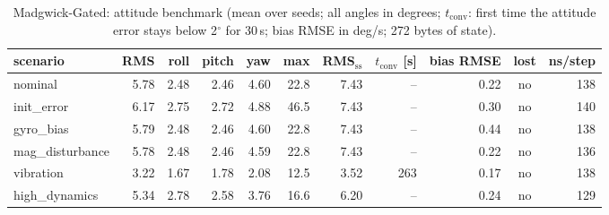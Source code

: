 \begin{table}[H]\centering\footnotesize\setlength{\tabcolsep}{3.5pt}\caption{Madgwick-Gated: attitude benchmark (mean over seeds; all angles in degrees; $t_\mathrm{conv}$: first time the attitude error stays below 2$^\circ$ for 30\,s; bias RMSE in deg/s; 272 bytes of state).}\label{tab:imu_MadgwickGated}
\begin{tabular}{lrrrrrrrrcr}\toprule scenario & RMS & roll & pitch & yaw & max & RMS$_\mathrm{ss}$ & $t_\mathrm{conv}$ [s] & bias RMSE & lost & ns/step \\ \midrule
nominal & 5.78 & 2.48 & 2.46 & 4.60 & 22.8 & 7.43 & -- & 0.22 & no & 138 \\
init\_error & 6.17 & 2.75 & 2.72 & 4.88 & 46.5 & 7.43 & -- & 0.30 & no & 140 \\
gyro\_bias & 5.79 & 2.48 & 2.46 & 4.60 & 22.8 & 7.43 & -- & 0.44 & no & 138 \\
mag\_disturbance & 5.78 & 2.48 & 2.46 & 4.59 & 22.8 & 7.43 & -- & 0.22 & no & 136 \\
vibration & 3.22 & 1.67 & 1.78 & 2.08 & 12.5 & 3.52 & 263 & 0.17 & no & 138 \\
high\_dynamics & 5.34 & 2.78 & 2.58 & 3.76 & 16.6 & 6.20 & -- & 0.24 & no & 129 \\
\bottomrule\end{tabular}\end{table}
